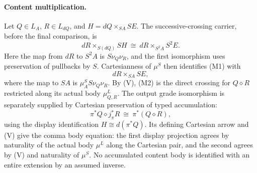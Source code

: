 \documentclass[11pt]{article}
\begin{document}
\paragraph{Content multiplication.} Let $Q\in L_A$, $R\in L_{dQ}$, and $H=dQ\times_{SA}SE$. The successive-crossing carrier, before the final comparison, is
\[
 dR\times_{S(dQ)}SH
 \ \cong\ dR\times_{S^2A}S^2E.
\tag{M1}
\]
Here the map from $dR$ to $S^2A$ is $S\nu_Q\nu_R$, and the first isomorphism uses preservation of pullbacks by $S$. Cartesianness of $\mu^S$ then identifies (M1) with
\[
 dR\times_{SA}SE,
\tag{M2}
\]
where the map to $SA$ is $\mu^S_A S\nu_Q\nu_R$. By (V), (M2) is the direct crossing for $Q\diamond R$ restricted along its actual body $\mu^L_{Q,R}$. The output grade isomorphism is separately supplied by Cartesian preservation of typed accumulation:
\[
 \pi^*Q\diamond j_\pi^*R\ \cong\ \pi^*(Q\diamond R),
\]
using the display identification $H\cong d(\pi^*Q)$. Its defining Cartesian arrow and (V) give the comma body equation: the first display projection agrees by naturality of the actual body $\mu^L$ along the Cartesian pair, and the second agrees by (V) and naturality of $\mu^S$. No accumulated content body is identified with an entire extension by an assumed inverse.
\end{document}

